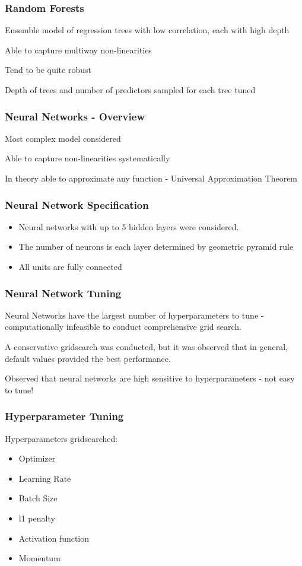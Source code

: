 \documentclass[aspectratio=169]{beamer}
\begin{document}
\begin{frame}
\frametitle{Random Forests}
Ensemble model of regression trees with low correlation, each with high depth

Able to capture multiway non-linearities

Tend to be quite robust

Depth of trees and number of predictors sampled for each tree tuned
\end{frame}


\begin{frame}
\frametitle{Neural Networks - Overview}
Most complex model considered

Able to capture non-linearities systematically

In theory able to approximate any function - Universal Approximation Theorem
\end{frame}

\begin{frame}
\frametitle{Neural Network Specification}

\begin{itemize}
\item Neural networks with up to 5 hidden layers were considered. 

\item The number of neurons is each layer determined by geometric pyramid rule \citep{masters_practical_1993}

\item All units are fully connected
\end{itemize}
\end{frame}

\begin{frame}
\frametitle{Neural Network Tuning}
Neural Networks have the largest number of hyperparameters to tune - computationally infeasible to conduct comprehensive grid search. 

A conservative gridsearch was conducted, but it was observed that in general, default values provided the best performance.

Observed that neural networks are high sensitive to hyperparameters - not easy to tune!
\end{frame}

\begin{frame}
\frametitle{Hyperparameter Tuning}
Hyperparameters gridsearched:
\begin{itemize}
	\item Optimizer
	\item Learning Rate
	\item Batch Size
	\item l1 penalty
	\item Activation function
	\item Momentum
\end{itemize}
\end{frame}
\end{document}
